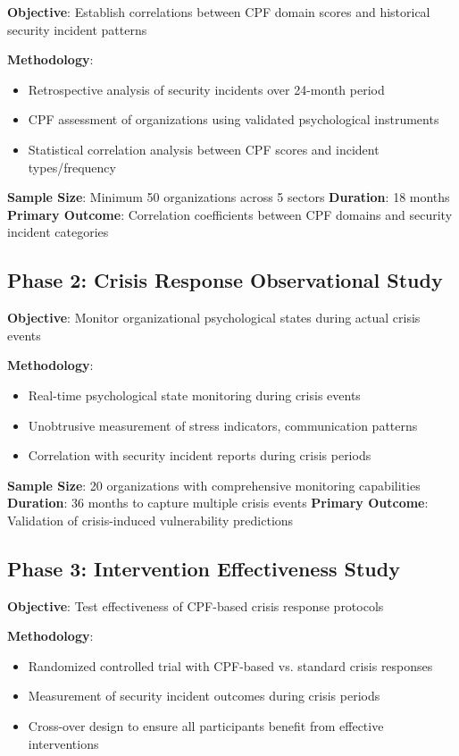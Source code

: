 \documentclass[11pt,a4paper]{article}
\begin{document}
\textbf{Objective}: Establish correlations between CPF domain scores and historical security incident patterns

\textbf{Methodology}: 
\begin{itemize}
\item Retrospective analysis of security incidents over 24-month period
\item CPF assessment of organizations using validated psychological instruments
\item Statistical correlation analysis between CPF scores and incident types/frequency
\end{itemize}

\textbf{Sample Size}: Minimum 50 organizations across 5 sectors
\textbf{Duration}: 18 months
\textbf{Primary Outcome}: Correlation coefficients between CPF domains and security incident categories

\subsection{Phase 2: Crisis Response Observational Study}

\textbf{Objective}: Monitor organizational psychological states during actual crisis events

\textbf{Methodology}:
\begin{itemize}
\item Real-time psychological state monitoring during crisis events
\item Unobtrusive measurement of stress indicators, communication patterns
\item Correlation with security incident reports during crisis periods
\end{itemize}

\textbf{Sample Size}: 20 organizations with comprehensive monitoring capabilities
\textbf{Duration}: 36 months to capture multiple crisis events
\textbf{Primary Outcome}: Validation of crisis-induced vulnerability predictions

\subsection{Phase 3: Intervention Effectiveness Study}

\textbf{Objective}: Test effectiveness of CPF-based crisis response protocols

\textbf{Methodology}:
\begin{itemize}
\item Randomized controlled trial with CPF-based vs. standard crisis responses
\item Measurement of security incident outcomes during crisis periods
\item Cross-over design to ensure all participants benefit from effective interventions
\end{itemize}
\end{document}
